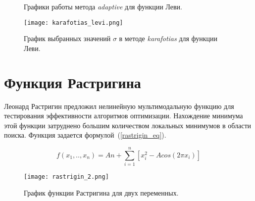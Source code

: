 \begin{figure}
  \centering
  \caption{ Графики работы метода \textit{adaptive} для функции Леви.}
  \label{adaptive_levi_plot}
\end{figure}

\begin{figure}
  \centering
  \texttt{[image: karafotias\_levi.png]}
  \caption{График выбранных значений $\sigma$ в методе \textit{karafotias} для функции Леви.}
  \label{karafotias_levi}
\end{figure}

\section{Функция Растригина}

Леонард Растригин предложил нелинейную мультимодальную функцию для тестирования эффективности алгоритмов оптимизации. Нахождение минимума этой функции затруднено большим количеством локальных минимумов в области поиска. Функция задается формулой~(\ref{rastrigin_eq}).

\begin{equation}
\label{rastrigin_eq}
f(x_1, .., x_n) = An + \sum\limits_{i = 1}^n\left[ x_i^2 - Acos\left(2 \pi x_i \right)\right]
\end{equation}

\begin{figure}
    \centering
    \texttt{[image: rastrigin\_2.png]}
    \caption{График функции Растригина для двух переменных.}
    \label{rastrigin_plot}
\end{figure}

